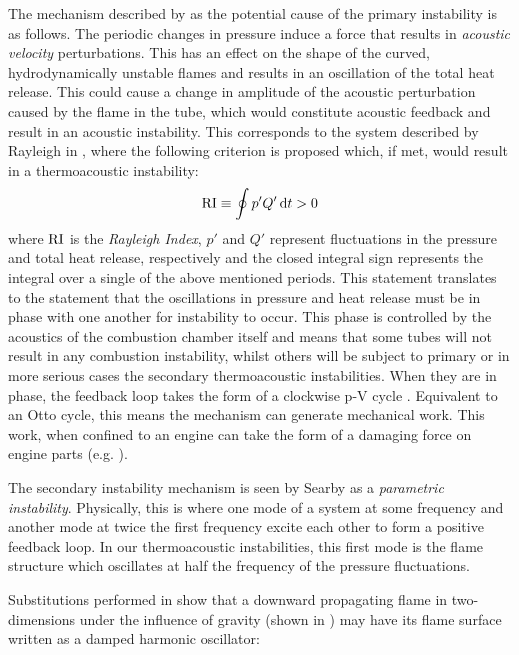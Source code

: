 The mechanism described by \cite{searby1992AcousticInstabilityPremixed} as the potential cause of the primary instability is as follows. The periodic changes in pressure induce a force that results in \emph{acoustic velocity} perturbations. This has an effect on the shape of the curved, hydrodynamically unstable flames and results in an oscillation of the total heat release. This could cause a change in amplitude of the acoustic perturbation caused by the flame in the tube, which would constitute acoustic feedback and result in an acoustic instability. This corresponds to the system described by Rayleigh in \cite{rayleigh1896TheorySound}, where the following criterion is proposed which, if met, would result in a thermoacoustic instability:
\begin{equation}
\rm{RI} \equiv \oint p' Q' \dd{t} > 0
\end{equation}
where $\rm{RI}$ is the \emph{Rayleigh Index}, $p'$ and $Q'$ represent fluctuations in the pressure and total heat release, respectively and the closed integral sign represents the integral over a single of the above mentioned periods. This statement translates to the statement that the oscillations in pressure and heat release must be in phase with one another for instability to occur. This phase is controlled by the acoustics of the combustion chamber itself and means that some tubes will not result in any combustion instability, whilst others will be subject to primary or in more serious cases the secondary thermoacoustic instabilities. When they are in phase, the feedback loop takes the form of a clockwise p-V cycle \cite{polifke2004CombustionInstabilities}. Equivalent to an Otto cycle, this means the mechanism can generate mechanical work. This work, when confined to an engine can take the form of a damaging force on engine parts (e.g. \cite{lieuwen2006CombustionInstabilitiesGas}).


The secondary instability mechanism is seen by Searby \cite{searby1992AcousticInstabilityPremixed} as a \emph{parametric instability}. Physically, this is where one mode of a system at some frequency and another mode at twice the first frequency excite each other to form a positive feedback loop. In our thermoacoustic instabilities, this first mode is the flame structure which oscillates at half the frequency of the pressure fluctuations.

Substitutions performed in \cite{searby1986WeaklyTurbulentWrinkled} show that a downward propagating flame in two-dimensions under the influence of gravity (shown in ) may have its flame surface written as a damped harmonic oscillator:

